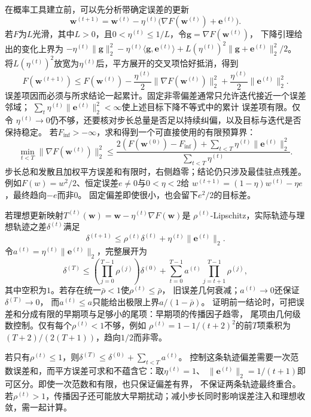在概率工具建立前，可以先分析带确定误差的更新
\[
  \bm{w}^{(t+1)}
  =\bm{w}^{(t)}-\eta^{(t)}
  \bigl(\nabla F(\bm{w}^{(t)})+\bm{e}^{(t)}\bigr).
\]
若$F$为$L$光滑，其中$L>0$，且$0<\eta^{(t)}\leq1/L$，令$\bm g=\nabla F(\bm w^{(t)})$，
下降引理给出的变化上界为
$-\eta^{(t)}\|\bm g\|_2^2-\eta^{(t)}\langle\bm g,\bm e^{(t)}\rangle
+L(\eta^{(t)})^2\|\bm g+\bm e^{(t)}\|_2^2/2$。
将$L(\eta^{(t)})^2$放宽为$\eta^{(t)}$后，平方展开的交叉项恰好抵消，得到
\[
  F(\bm{w}^{(t+1)})
  \leq F(\bm{w}^{(t)})
  -\frac{\eta^{(t)}}{2}\lVert\nabla F(\bm{w}^{(t)})\rVert_2^2
  +\frac{\eta^{(t)}}{2}\lVert\bm{e}^{(t)}\rVert_2^2.
\]
误差项因而必须与所求结论一起累计。固定非零偏差通常只允许迭代接近一个误差邻域；
$\sum_t\eta^{(t)}\lVert\bm{e}^{(t)}\rVert_2^2<\infty$使上述目标下降不等式中的累计
误差项有限。仅令
$\eta^{(t)}\to0$仍不够，还要核对步长总量是否足以持续纠偏，以及目标与迭代是否保持稳定。
若$F_{\inf}>-\infty$，求和得到一个可直接使用的有限预算界：
\begin{equation}
 \min_{t<T}\|\nabla F(\bm w^{(t)})\|_2^2
 \leq\frac{2(F(\bm w^{(0)})-F_{\inf})
             +\sum_{t<T}\eta^{(t)}\|\bm e^{(t)}\|_2^2}
            {\sum_{t<T}\eta^{(t)}}.
 \label{eq:opt-inexact-gradient-finite-rate}
\end{equation}
步长总和发散且加权平方误差和有限时，右侧趋零；结论仍只涉及最佳驻点残差。
例如$F(w)=w^2/2$、恒定误差$e\neq0$与$0<\eta<2$给
$w^{(t+1)}=(1-\eta)w^{(t)}-\eta e$，最终趋向$-e$而非$0$。
固定偏差即使很小，也会留下$e^2/2$的目标差。

若理想更新映射$T^{(t)}(\bm{w})=\bm{w}-\eta^{(t)}\nabla F(\bm{w})$是
$\rho^{(t)}$-Lipschitz，实际轨迹与理想轨迹之差$\delta^{(t)}$满足
\begin{equation}
  \delta^{(t+1)}\leq\rho^{(t)}\delta^{(t)}+\eta^{(t)}\lVert\bm{e}^{(t)}\rVert_2.
  \label{eq:opt-inexact-gradient-recurrence}
\end{equation}
令$a^{(t)}=\eta^{(t)}\|\bm e^{(t)}\|_2$，完整展开为
\[
 \delta^{(T)}\leq\left(\prod_{j=0}^{T-1}\rho^{(j)}\right)\delta^{(0)}
 +\sum_{t=0}^{T-1}a^{(t)}\prod_{j=t+1}^{T-1}\rho^{(j)},
\]
其中空积为$1$。若存在统一$\bar\rho<1$使$\rho^{(t)}\leq\bar\rho$，
旧误差几何衰减；$a^{(t)}\to0$还保证$\delta^{(T)}\to0$，
而$a^{(t)}\leq a$只能给出极限上界$a/(1-\bar\rho)$。
证明前一结论时，可把误差和分成有限的早期项与足够小的尾项：早期项的传播因子趋零，
尾项由几何级数控制。仅有每个$\rho^{(t)}<1$不够，例如
$\rho^{(t)}=1-1/(t+2)^2$的前$T$项乘积为$(T+2)/(2(T+1))$，趋向$1/2$而非零。

若只有$\rho^{(t)}\leq1$，则$\delta^{(T)}\leq\delta^{(0)}+\sum_{t<T}a^{(t)}$。
控制这条轨迹偏差需要一次范数误差和，而平方误差可求和不蕴含它：取$\eta^{(t)}=1$、
$\|\bm e^{(t)}\|_2=1/(t+1)$即可区分。即使一次范数和有限，也只保证偏差有界，
不保证两条轨迹最终重合。
若$\rho^{(t)}>1$，传播因子还可能放大早期扰动；减小步长同时影响误差注入和理想收敛，需一起计算。

